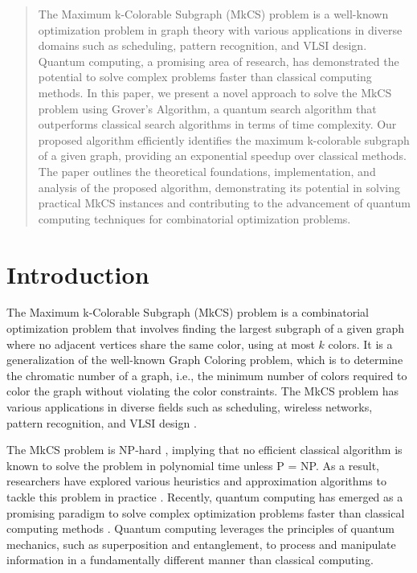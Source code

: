 \begin{abstract}
The Maximum k-Colorable Subgraph (MkCS) problem is a well-known optimization problem in graph theory with various applications in diverse domains such as scheduling, pattern recognition, and VLSI design. Quantum computing, a promising area of research, has demonstrated the potential to solve complex problems faster than classical computing methods. In this paper, we present a novel approach to solve the MkCS problem using Grover's Algorithm, a quantum search algorithm that outperforms classical search algorithms in terms of time complexity. Our proposed algorithm efficiently identifies the maximum k-colorable subgraph of a given graph, providing an exponential speedup over classical methods. The paper outlines the theoretical foundations, implementation, and analysis of the proposed algorithm, demonstrating its potential in solving practical MkCS instances and contributing to the advancement of quantum computing techniques for combinatorial optimization problems.

\end{abstract}

\section{Introduction}

The Maximum k-Colorable Subgraph (MkCS) problem is a combinatorial optimization problem that involves finding the largest subgraph of a given graph where no adjacent vertices share the same color, using at most $k$ colors. It is a generalization of the well-known Graph Coloring problem, which is to determine the chromatic number of a graph, i.e., the minimum number of colors required to color the graph without violating the color constraints. The MkCS problem has various applications in diverse fields such as scheduling, wireless networks, pattern recognition, and VLSI design \cite{garey1979,malik1994}.

The MkCS problem is NP-hard \cite{garey1979}, implying that no efficient classical algorithm is known to solve the problem in polynomial time unless P = NP. As a result, researchers have explored various heuristics and approximation algorithms to tackle this problem in practice \cite{johnson1985,galinier1999}. Recently, quantum computing has emerged as a promising paradigm to solve complex optimization problems faster than classical computing methods \cite{shor1994,grover1996}. Quantum computing leverages the principles of quantum mechanics, such as superposition and entanglement, to process and manipulate information in a fundamentally different manner than classical computing.

